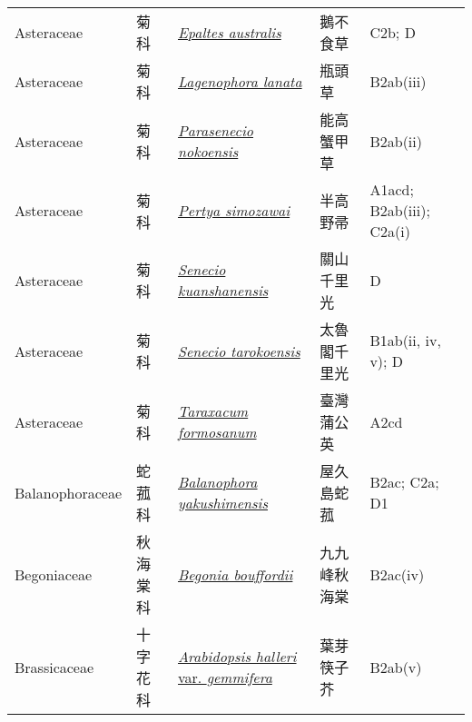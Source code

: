 {\begin{longtable}{p{2.5cm}p{2.5cm}p{4.5cm}p{2.5cm}p{3cm}}
    Asteraceae & 菊科 & \href{http://www.theplantlist.org/tpl1.1/search?q=Epaltes+australis}{\textit{Epaltes australis} } & 鵝不食草 & C2b; D \index{Epaltes@\textit{Epaltes}!australis@\textit{australis}}  \index{鵝不食草} \\
    Asteraceae & 菊科 & \href{http://www.theplantlist.org/tpl1.1/search?q=Lagenophora+lanata}{\textit{Lagenophora lanata} } & 瓶頭草 & B2ab(iii) \index{Lagenophora@\textit{Lagenophora}!lanata@\textit{lanata}}  \index{瓶頭草} \\
    Asteraceae & 菊科 & \href{http://www.theplantlist.org/tpl1.1/search?q=Parasenecio+nokoensis}{\textit{Parasenecio nokoensis} } & 能高蟹甲草 & B2ab(ii) \index{Parasenecio@\textit{Parasenecio}!nokoensis@\textit{nokoensis}}  \index{能高蟹甲草} \\
    Asteraceae & 菊科 & \href{http://www.theplantlist.org/tpl1.1/search?q=Pertya+simozawai}{\textit{Pertya simozawai} } & 半高野帚 & A1acd; B2ab(iii); C2a(i) \index{Pertya@\textit{Pertya}!simozawai@\textit{simozawai}}  \index{半高野帚} \\
    Asteraceae & 菊科 & \href{http://www.theplantlist.org/tpl1.1/search?q=Senecio+kuanshanensis}{\textit{Senecio kuanshanensis} } & 關山千里光 & D \index{Senecio@\textit{Senecio}!kuanshanensis@\textit{kuanshanensis}}  \index{關山千里光} \\
    Asteraceae & 菊科 & \href{http://www.theplantlist.org/tpl1.1/search?q=Senecio+tarokoensis}{\textit{Senecio tarokoensis} } & 太魯閣千里光 & B1ab(ii, iv, v); D \index{Senecio@\textit{Senecio}!tarokoensis@\textit{tarokoensis}}  \index{太魯閣千里光} \\
    Asteraceae & 菊科 & \href{http://www.theplantlist.org/tpl1.1/search?q=Taraxacum+formosanum}{\textit{Taraxacum formosanum} } & 臺灣蒲公英 & A2cd \index{Taraxacum@\textit{Taraxacum}!formosanum@\textit{formosanum}}  \index{臺灣蒲公英} \\
    Balanophoraceae & 蛇菰科 & \href{http://www.theplantlist.org/tpl1.1/search?q=Balanophora+yakushimensis}{\textit{Balanophora yakushimensis} } & 屋久島蛇菰 & B2ac; C2a; D1 \index{Balanophora@\textit{Balanophora}!yakushimensis@\textit{yakushimensis}}  \index{屋久島蛇菰} \\
    Begoniaceae & 秋海棠科 & \href{http://www.theplantlist.org/tpl1.1/search?q=Begonia+bouffordii}{\textit{Begonia bouffordii} } & 九九峰秋海棠 & B2ac(iv) \index{Begonia@\textit{Begonia}!bouffordii@\textit{bouffordii}}  \index{九九峰秋海棠} \\
    Brassicaceae & 十字花科 & \href{http://www.theplantlist.org/tpl1.1/search?q=Arabidopsis+halleri+var.+gemmifera}{\textit{Arabidopsis halleri} var. \textit{gemmifera} } & 葉芽筷子芥 & B2ab(v) \index{Arabidopsis@\textit{Arabidopsis}!halleri@\textit{halleri}!var. gemmifera@var. \textit{gemmifera}}  \index{葉芽筷子芥} \\

\end{longtable}}
